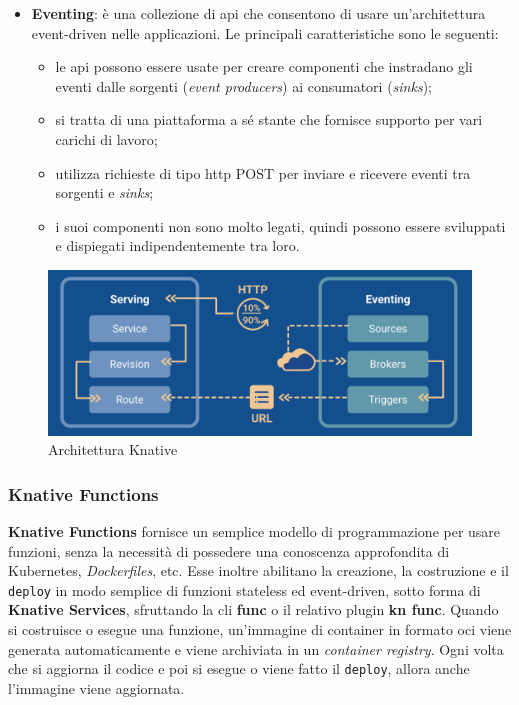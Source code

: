 \documentclass[12pt,a4paper,openany,twoside]{book}
\begin{document}
\begin{itemize}
    \item \textbf{Eventing}: è una collezione di \ac{api} che consentono di usare un'architettura event-driven nelle applicazioni.
    Le principali caratteristiche sono le seguenti:
    \begin{itemize}
        \item le \ac{api} possono essere usate per creare componenti che instradano gli eventi dalle sorgenti (\textit{event producers}) ai consumatori (\textit{sinks});
        
        \item si tratta di una piattaforma a sé stante che fornisce supporto per vari carichi di lavoro;
        
        \item utilizza richieste di tipo \ac{http} POST per inviare e ricevere eventi tra sorgenti e \textit{sinks};
        
        \item i suoi componenti non sono molto legati, quindi possono essere sviluppati e dispiegati indipendentemente tra loro.
    \end{itemize}
\end{itemize}

\begin{figure}[ht]
    \centering
    \includegraphics[width=\linewidth]{figures/knative_architecture.pdf}
    \caption{Architettura Knative}
    \label{fig:architettura-knative}
\end{figure}

\subsubsection{Knative Functions}

\textbf{Knative Functions} fornisce un semplice modello di programmazione per usare funzioni, senza la necessità di possedere una conoscenza approfondita di Kubernetes, \textit{Dockerfiles}, etc.
Esse inoltre abilitano la creazione, la costruzione e il \texttt{deploy} in modo semplice di funzioni stateless ed event-driven, sotto forma di \textbf{Knative Services}, sfruttando la \ac{cli} \textbf{func} o il relativo plugin \textbf{kn func}.
Quando si costruisce o esegue una funzione, un'immagine di container in formato \ac{oci} viene generata automaticamente e viene archiviata in un \textit{container registry}. Ogni volta che si aggiorna il codice e poi si esegue o viene fatto il \texttt{deploy}, allora anche l'immagine viene aggiornata.
\end{document}
